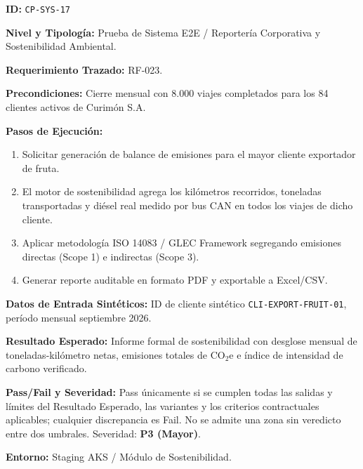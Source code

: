 \par\noindent\textbf{ID:} \texttt{C\allowbreak{}P\allowbreak{}-\allowbreak{}S\allowbreak{}Y\allowbreak{}S\allowbreak{}-\allowbreak{}1\allowbreak{}7\allowbreak{}}\par
\par\noindent\textbf{Nivel y Tipología:} Prueba de Sistema E2E / Reportería Corporativa y Sostenibilidad Ambiental.\par
\par\noindent\textbf{Requerimiento Trazado:} RF-023.\par
\par\noindent\textbf{Precondiciones:} Cierre mensual con 8.000 viajes completados para los 84 clientes activos de Curimón S.A.\par
\par\noindent\textbf{Pasos de Ejecución:} \par
\begin{enumerate}
\item Solicitar generación de balance de emisiones para el mayor cliente exportador de fruta.
\item El motor de sostenibilidad agrega los kilómetros recorridos, toneladas transportadas y diésel real medido por bus CAN en todos los viajes de dicho cliente.
\item Aplicar metodología ISO 14083 / GLEC Framework segregando emisiones directas (Scope 1) e indirectas (Scope 3).
\item Generar reporte auditable en formato PDF y exportable a Excel/CSV.
\end{enumerate}
\par\noindent\textbf{Datos de Entrada Sintéticos:} ID de cliente sintético \texttt{C\allowbreak{}L\allowbreak{}I\allowbreak{}-\allowbreak{}E\allowbreak{}X\allowbreak{}P\allowbreak{}O\allowbreak{}R\allowbreak{}T\allowbreak{}-\allowbreak{}F\allowbreak{}R\allowbreak{}U\allowbreak{}I\allowbreak{}T\allowbreak{}-\allowbreak{}0\allowbreak{}1\allowbreak{}}, período mensual septiembre 2026.\par
\par\noindent\textbf{Resultado Esperado:} Informe formal de sostenibilidad con desglose mensual de toneladas-kilómetro netas, emisiones totales de \(\text{CO}_2\text{e}\) e índice de intensidad de carbono verificado.\par
\par\noindent\textbf{Pass/Fail y Severidad:} Pass únicamente si se cumplen todas las salidas y límites del Resultado Esperado, las variantes y los criterios contractuales aplicables; cualquier discrepancia es Fail. No se admite una zona sin veredicto entre dos umbrales. Severidad: \textbf{P3 (Mayor)}.\par
\par\noindent\textbf{Entorno:} Staging AKS / Módulo de Sostenibilidad.\par







